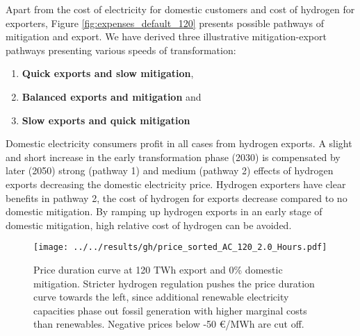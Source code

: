 Apart from the cost of electricity for domestic customers and cost of hydrogen for exporters, Figure \ref{fig:expenses_default_120} presents possible pathways of mitigation and export. We have derived three illustrative mitigation-export pathways presenting various speeds of transformation:
\begin{enumerate}
    \item \textbf{Quick exports and slow mitigation},
    \item \textbf{Balanced exports and mitigation} and
    \item \textbf{Slow exports and quick mitigation}
\end{enumerate}

Domestic electricity consumers profit in all cases from hydrogen exports. A slight and short increase in the early transformation phase (2030) is compensated by later (2050) strong (pathway 1) and medium (pathway 2) effects of hydrogen exports decreasing the domestic electricity price. Hydrogen exporters have clear benefits in pathway 2, the cost of hydrogen for exports decrease compared to no domestic mitigation. By ramping up hydrogen exports in an early stage of domestic mitigation, high relative cost of hydrogen can be avoided.


\begin{figure}[h!]
    \centering
    \texttt{[image: ../../results/gh/price\_sorted\_AC\_120\_2.0\_Hours.pdf]}
    \caption{Price duration curve at 120 TWh export and 0\% domestic mitigation. Stricter hydrogen regulation pushes the price duration curve towards the left, since additional renewable electricity capacities phase out fossil generation with higher marginal costs than renewables. Negative prices below -50 €/MWh are cut off.}
    \label{fig:pdc-120-0}
\end{figure}



